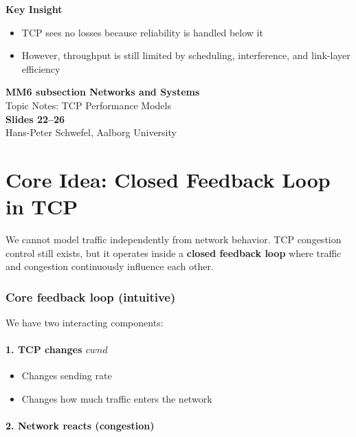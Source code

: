 \begin{notebox}
\textbf{Key Insight}

\begin{itemize}
    \item TCP sees no losses because reliability is handled below it
    \item However, throughput is still limited by scheduling, interference, and link-layer efficiency
\end{itemize}
\end{notebox}
\clearpage
\begin{center}
  {\LARGE\bfseries\color{aaublue}
    MM6 subsection Networks and Systems}\\[0.4em]
  {\large\color{accentgray}
    Topic Notes: TCP Performance Models}\\[0.2em]
  {\large\bfseries Slides 22--26}\\[0.3em]
  {\small\color{accentgray}
    Hans-Peter Schwefel, Aalborg University}
\end{center}

\section*{Core Idea: Closed Feedback Loop in TCP}

We cannot model traffic independently from network behavior. TCP congestion control still exists, but it operates inside a \textbf{closed feedback loop} where traffic and congestion continuously influence each other.

\subsubsection*{Core feedback loop (intuitive)}

We have two interacting components:

\paragraph{1. TCP changes $cwnd$}

\begin{itemize}
    \item Changes sending rate
    \item Changes how much traffic enters the network
\end{itemize}

\paragraph{2. Network reacts (congestion)}

